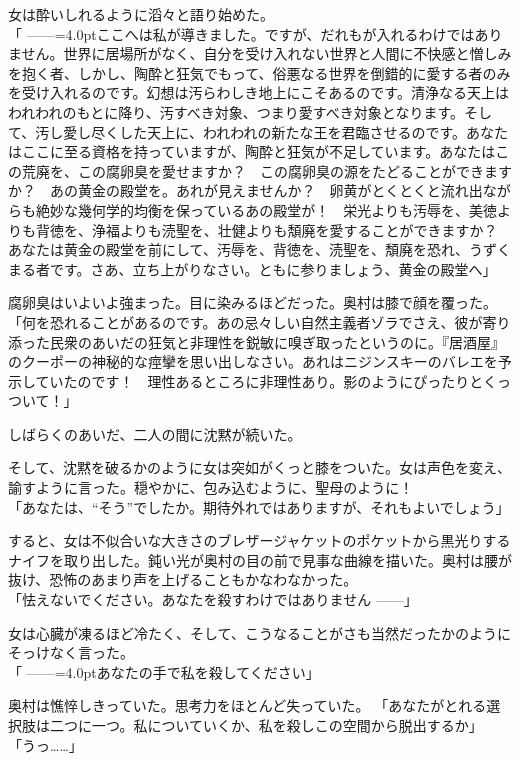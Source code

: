 \documentclass[b5j,twoside,twocolumn]{utarticle}
\begin{document}
女は酔いしれるように滔々と語り始めた。\\
「\tbaselineshift =2.5pt ------\tbaselineshift =4.0ptここへは私が導きました。ですが、だれもが入れるわけではありません。世界に居場所がなく、自分を受け入れない世界と人間に不快感と憎しみを抱く者、しかし、陶酔と狂気でもって、俗悪なる世界を倒錯的に愛する者のみを受け入れるのです。幻想は汚らわしき地上にこそあるのです。清浄なる天上はわれわれのもとに降り、汚すべき対象、つまり愛すべき対象となります。そして、汚し愛し尽くした天上に、われわれの新たな王を君臨させるのです。あなたはここに至る資格を持っていますが、陶酔と狂気が不足しています。あなたはこの荒廃を、この腐卵臭を愛せますか？　この腐卵臭の源をたどることができますか？　あの黄金の殿堂を。あれが見えませんか？　卵黄がとくとくと流れ出ながらも絶妙な幾何学的均衡を保っているあの殿堂が！　栄光よりも汚辱を、美徳よりも背徳を、浄福よりも涜聖を、壮健よりも頽廃を愛することができますか？　あなたは黄金の殿堂を前にして、汚辱を、背徳を、涜聖を、頽廃を恐れ、うずくまる者です。さあ、立ち上がりなさい。ともに参りましょう、黄金の殿堂へ」


腐卵臭はいよいよ強まった。目に染みるほどだった。奥村は膝で顔を覆った。\\
「何を恐れることがあるのです。あの忌々しい自然主義者ゾラでさえ、彼が寄り添った民衆のあいだの狂気と非理性を鋭敏に嗅ぎ取ったというのに。『居酒屋』のクーポーの神秘的な痙攣を思い出しなさい。あれはニジンスキーのバレエを予示していたのです！　理性あるところに非理性あり。影のようにぴったりとくっついて！」


しばらくのあいだ、二人の間に沈黙が続いた。


そして、沈黙を破るかのように女は突如がくっと膝をついた。女は声色を変え、諭すように言った。穏やかに、包み込むように、聖母のように！\\
「あなたは、“そう”でしたか。期待外れではありますが、それもよいでしょう」


すると、女は不似合いな大きさのブレザージャケットのポケットから黒光りするナイフを取り出した。鈍い光が奥村の目の前で見事な曲線を描いた。奥村は腰が抜け、恐怖のあまり声を上げることもかなわなかった。\\
「怯えないでください。あなたを殺すわけではありません\tbaselineshift =2.5pt ------\tbaselineshift =4.0pt」


女は心臓が凍るほど冷たく、そして、こうなることがさも当然だったかのようにそっけなく言った。\\
「\tbaselineshift =2.5pt ------\tbaselineshift =4.0ptあなたの手で私を殺してください」


奥村は憔悴しきっていた。思考力をほとんど失っていた。
「あなたがとれる選択肢は二つに一つ。私についていくか、私を殺しこの空間から脱出するか」\\
「うっ……」
\end{document}
